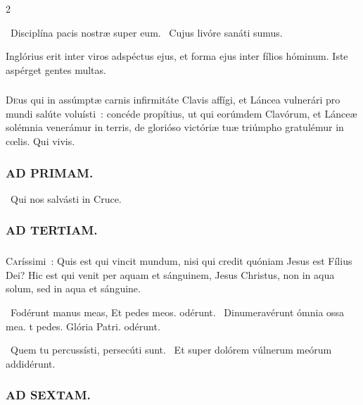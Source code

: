 \documentclass[9pt,twoside]{extarticle}
\begin{document}
\begin{multicols}{2}
\begin{tightlist}{}
\item {}~Disciplína pacis nostræ super eum. ~Cujus livóre sanáti sumus.
\item {} Inglórius erit inter viros adspéctus ejus, et forma ejus inter fílios hóminum. Iste aspérget gentes multas.
\end{tightlist}

\subsubsection*{\center {}}
\lettrine{D}eus qui in assúmptæ carnis infirmitáte Clavis affígi, et Láncea vulnerári pro mundi salúte voluísti~: concéde propítius, ut qui eorúmdem Clavórum, et Lánceæ solémnia venerámur in terris, de glorióso victóriæ tuæ triúmpho gratulémur in cœlis. Qui vivis.

\subsubsection*{\center \textsc{AD PRIMAM.}}
\noindent {}~Qui nos salvásti in Cruce.

\subsubsection*{\center \textsc{AD TERTIAM.}}
\subsubsection*{}
\lettrine{C}aríssimi~: Quis est qui vincit mundum, nisi qui credit quóniam Jesus est Fílius Dei? Hic est qui venit per aquam et sánguinem, Jesus Christus, non in aqua solum, sed in aqua et sánguine.

\begin{tightlist}{}
\item {}~Fodérunt manus meas, \textred{*} Et pedes meos. odérunt. ~Dinumeravérunt ómnia ossa mea. t pedes. Glória Patri. odérunt.
\item {}~Quem tu percussísti, persecúti sunt. ~Et super dolórem vúlnerum meórum addidérunt.
\end{tightlist}

\subsubsection*{\center \textsc{AD SEXTAM.}}

\end{multicols}
\end{document}
